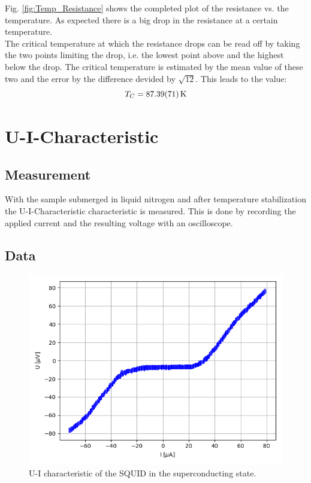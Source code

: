 \documentclass[12pt,a4paper]{article}
\begin{document}
Fig. \ref{fig:Temp_Resistance} shows the completed plot of the resistance vs. the temperature. As expected there is a big drop in the resistance at a certain temperature. \\
The critical temperature at which the resistance drops can be read off by taking the two points limiting the drop, i.e. the lowest point above and the highest below the drop. The critical temperature is estimated by the mean value of these two and the error by the difference devided by $\sqrt{12}$. This leads to the value:
\begin{equation*}
T_C = \SI{87.39 \pm 0.71}{K}
\end{equation*}


\section{U-I-Characteristic}
\subsection{Measurement}
With the sample submerged in liquid nitrogen and after temperature stabilization the U-I-Characteristic characteristic is measured. This is done by recording the applied current and the resulting voltage with an oscilloscope.

\subsection{Data}

\begin{figure} [H]
\centering
\includegraphics[scale=0.8]{Bilder/U_I_characteristic/characteristic.PNG}
\caption{U-I characteristic of the SQUID in the superconducting state.}
\label{fig:U-I-characteristic}
\end{figure}
\end{document}
